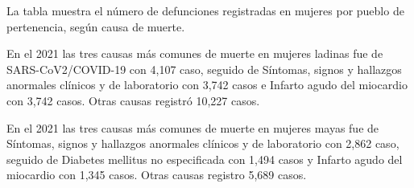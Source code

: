 La tabla muestra el número de defunciones registradas en mujeres por pueblo de pertenencia, según causa de muerte. 

En el 2021 las tres causas más comunes de muerte en mujeres ladinas fue de SARS-CoV2/COVID-19 con 4,107 caso, seguido de 	Síntomas, signos y hallazgos anormales clínicos y de laboratorio con 3,742 casos e Infarto agudo del miocardio con 3,742 casos. Otras causas registró 10,227 casos. 

En el 2021 las tres causas más comunes de muerte en mujeres mayas fue de Síntomas, signos y hallazgos anormales clínicos y de laboratorio con 2,862 caso, seguido de Diabetes mellitus no especificada con 1,494 casos y Infarto agudo del miocardio con 1,345 casos. Otras causas registro 5,689 casos.